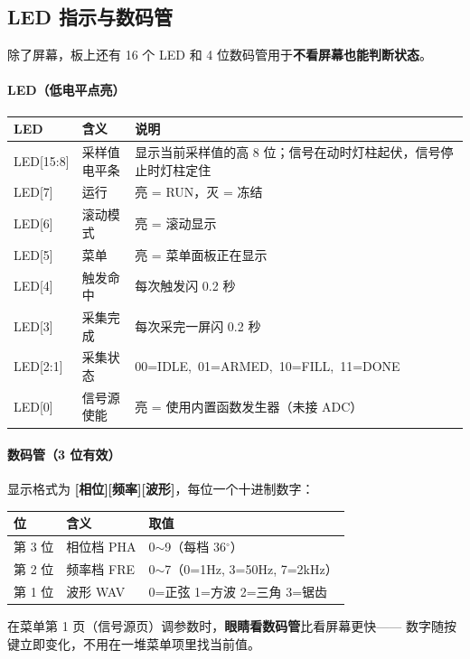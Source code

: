 \documentclass[UTF8,a4paper,11pt]{ctexart}
\begin{document}
\subsection{LED 指示与数码管}

除了屏幕，板上还有 16 个 LED 和 4 位数码管用于\textbf{不看屏幕也能判断状态}。

\paragraph{LED（低电平点亮）}
\begin{center}
\small
\begin{tabular}{llp{8.2cm}}
\toprule
LED & 含义 & 说明\\
\midrule
LED[15:8] & 采样值电平条 & 显示当前采样值的高 8 位；信号在动时灯柱起伏，信号停止时灯柱定住\\
LED[7] & 运行 & 亮 = RUN，灭 = 冻结\\
LED[6] & 滚动模式 & 亮 = 滚动显示\\
LED[5] & 菜单 & 亮 = 菜单面板正在显示\\
LED[4] & 触发命中 & 每次触发闪 0.2 秒\\
LED[3] & 采集完成 & 每次采完一屏闪 0.2 秒\\
LED[2:1] & 采集状态 & 00=IDLE,\ 01=ARMED,\ 10=FILL,\ 11=DONE\\
LED[0] & 信号源使能 & 亮 = 使用内置函数发生器（未接 ADC）\\
\bottomrule
\end{tabular}
\end{center}

\paragraph{数码管（3 位有效）}
显示格式为 \textbf{[相位][频率][波形]}，每位一个十进制数字：

\begin{center}
\small
\begin{tabular}{lll}
\toprule
位 & 含义 & 取值\\
\midrule
第 3 位 & 相位档 PHA & 0$\sim$9（每档 36$^\circ$）\\
第 2 位 & 频率档 FRE & 0$\sim$7（0=1Hz, 3=50Hz, 7=2kHz）\\
第 1 位 & 波形 WAV & 0=正弦 1=方波 2=三角 3=锯齿\\
\bottomrule
\end{tabular}
\end{center}

\begin{tipbox}
在菜单第 1 页（信号源页）调参数时，\textbf{眼睛看数码管}比看屏幕更快——
数字随按键立即变化，不用在一堆菜单项里找当前值。
\end{tipbox}
\end{document}
